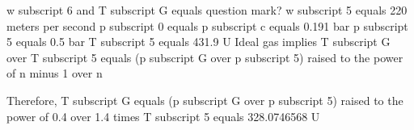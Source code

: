 w subscript 6 and T subscript G equals question mark?
w subscript 5 equals 220 meters per second
p subscript 0 equals p subscript c equals 0.191 bar
p subscript 5 equals 0.5 bar
T subscript 5 equals 431.9 U
Ideal gas implies T subscript G over T subscript 5 equals (p subscript G over p subscript 5) raised to the power of n minus 1 over n

Therefore, T subscript G equals (p subscript G over p subscript 5) raised to the power of 0.4 over 1.4 times T subscript 5 equals 328.0746568 U